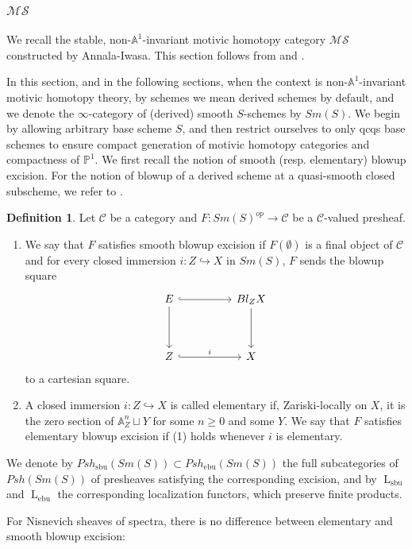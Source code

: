 \documentclass{article}
\theoremstyle{definition}
\newtheorem{defn}[thm]{Definition}
\newcommand{\on}{\operatorname}
\begin{document}
\subsubsection{$\mathcal{MS}$}
We recall the stable, non-$\mathbb{A}^1$-invariant motivic homotopy category $\mathcal{MS}$ constructed by Annala-Iwasa. This section follows from \cite{AHI} and \cite{AI}.


In this section, and in the following sections, when the context is non-$\mathbb{A}^1$-invariant motivic homotopy theory, by schemes we mean derived schemes by default, and we denote the $\infty$-category of (derived) smooth $S$-schemes by $Sm(S)$. We begin by allowing arbitrary base scheme $S$, and then restrict ourselves to only qcqs base schemes to ensure compact generation of motivic homotopy categories and compactness of $\mathbb{P}^1$. We first recall the notion of smooth (resp. elementary) blowup excision. For the notion of blowup of a derived scheme at a quasi-smooth closed subscheme, we refer to \cite{KR}.
\begin{defn}
Let $\mathcal{C}$ be a category and $F: Sm(S)^{op}\rightarrow \mathcal{C}$ be a $\mathcal{C}$-valued presheaf.
\begin{enumerate}
\item We say that $F$ satisfies smooth blowup excision if $F(\emptyset)$ is a final object of $\mathcal{C}$ and for every closed immersion $i: Z \hookrightarrow X$ in $Sm(S)$, $F$ sends the blowup square
\[\begin{tikzcd}
	E && {Bl_ZX} \\
	\\
	Z && X
	\arrow[hook, from=1-1, to=1-3]
	\arrow[from=1-1, to=3-1]
	\arrow[from=1-3, to=3-3]
	\arrow["i", hook, from=3-1, to=3-3]
\end{tikzcd}\]
to a cartesian square.
\item A closed immersion $i: Z \hookrightarrow X$ is called elementary if, Zariski-locally on $X$, it is the zero section of $\mathbb{A}_Z^n \sqcup Y$ for some $n \geq 0$ and some $Y$. We say that $F$ satisfies elementary blowup excision if (1) holds whenever $i$ is elementary.
\end{enumerate}
We denote by $Psh_{\on{sbu}}(Sm(S))\subset Psh_{\on{ebu}}(Sm(S))$ the full subcategories of $Psh(Sm(S))$ of presheaves satisfying the corresponding excision, and by $\on{L}_{\on{sbu}}$ and $\on{L}_{\on{ebu}}$ the corresponding localization functors, which preserve finite products.
\end{defn}
For Nisnevich sheaves of spectra, there is no difference between elementary and smooth blowup excision:
\end{document}
